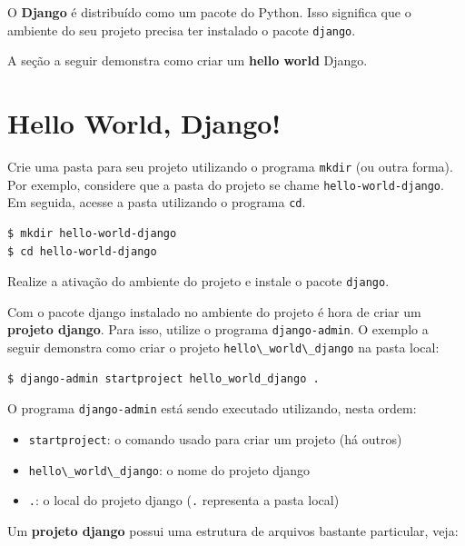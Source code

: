 \documentclass[brazil,a4paper,oneside,openright,parskip=full]{book}
\newcommand{\passthrough}[1]{#1}
\providecommand{\tightlist}{%
  \setlength{\itemsep}{0pt}\setlength{\parskip}{0pt}}
\begin{document}
O \textbf{Django} é distribuído como um pacote do Python. Isso significa
que o ambiente do seu projeto precisa ter instalado o pacote
\passthrough{\lstinline!django!}.

A seção a seguir demonstra como criar um \textbf{hello world} Django.

\hypertarget{hello-world-django}{%
\section{Hello World, Django!}\label{hello-world-django}}

Crie uma pasta para seu projeto utilizando o programa
\passthrough{\lstinline!mkdir!} (ou outra forma). Por exemplo, considere
que a pasta do projeto se chame
\passthrough{\lstinline!hello-world-django!}. Em seguida, acesse a pasta
utilizando o programa \passthrough{\lstinline!cd!}.

\begin{lstlisting}[language=sh, style=nonumber]
$ mkdir hello-world-django
$ cd hello-world-django
\end{lstlisting}

Realize a ativação do ambiente do projeto e instale o pacote
\passthrough{\lstinline!django!}.

Com o pacote django instalado no ambiente do projeto é hora de criar um
\textbf{projeto django}. Para isso, utilize o programa
\passthrough{\lstinline!django-admin!}. O exemplo a seguir demonstra
como criar o projeto \passthrough{\lstinline!hello\_world\_django!} na
pasta local:

\begin{lstlisting}[language=sh, style=nonumber]
$ django-admin startproject hello_world_django .
\end{lstlisting}

O programa \passthrough{\lstinline!django-admin!} está sendo executado
utilizando, nesta ordem:

\begin{itemize}
\tightlist
\item
  \passthrough{\lstinline!startproject!}: o comando usado para criar um
  projeto (há outros)
\item
  \passthrough{\lstinline!hello\_world\_django!}: o nome do projeto
  django
\item
  \passthrough{\lstinline!.!}: o local do projeto django
  (\passthrough{\lstinline!.!} representa a pasta local)
\end{itemize}

Um \textbf{projeto django} possui uma estrutura de arquivos bastante
particular, veja:
\end{document}
